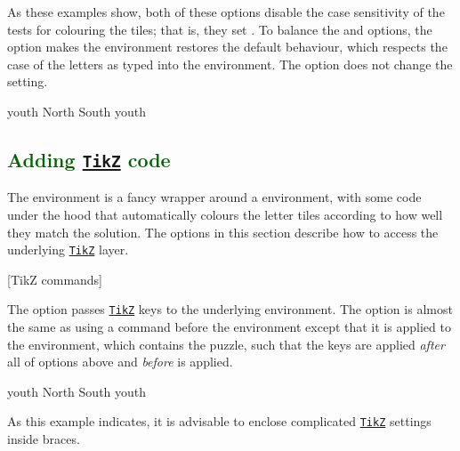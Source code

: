 \documentclass[svgnames]{report}
\newcommand\ctan[1]{\href{https://www.ctan.org/pkg/#1}{\texttt{#1}}}
\newcommand\Section[1]{\subsection{\textcolor{DarkGreen}{#1}}}
\begin{document}
  As these examples show, both of these options disable the case
  sensitivity of the tests for colouring the  tiles;
  that is, they set .  To balance the
   and  options, the
   option makes the  environment
  restores the default behaviour, which respects the case of the letters
  as typed into the environment. The  option does
  not change the  setting.

  \begin{example}
  \begin{wordle}{youth} %
    North
    South
    youth
  \end{wordle}
  \end{example}

  \Section{Adding \ctan{TikZ} code}

  The  environment is a fancy wrapper around a
   environment, with some code under the hood that
  automatically colours the letter tiles according to how well they
  match the solution. The options in this section describe how to access
  the underlying \ctan{TikZ} layer.

  [TikZ commands]

  The  option passes \ctan{TikZ} keys to the underlying
   environment. The  option is almost
  the same as using a \keyword{\tikzset{...}} command before the
   environment except that it is applied to the
   environment, which contains the 
  puzzle, such that the  keys are applied \textit{after}
  all of options above and \textit{before}  is
  applied.

  \begin{example}
  \begin{wordle}[
      tikz={framed,
            background rectangle/.style={
              double,ultra thick, draw=SteelBlue
            }
      }]{youth}
    North South youth
  \end{wordle}
  \end{example}

  As this example indicates, it is advisable to enclose complicated
  \ctan{TikZ} settings inside braces.
\end{document}

